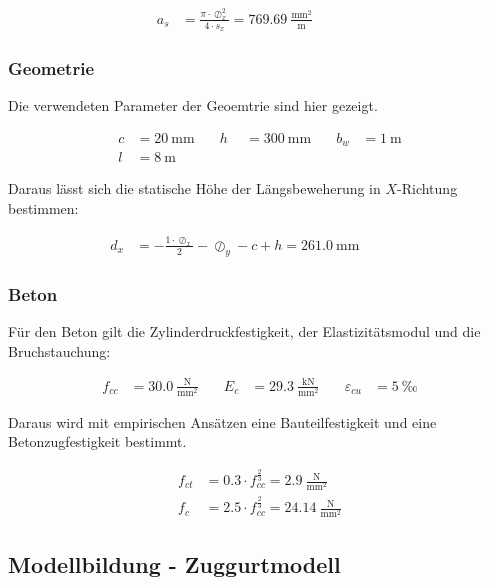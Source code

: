 \documentclass[
  11pt,
  letterpaper,
]{scrreprt}
\begin{document}
\[
\begin{aligned}
a_{s}& = \frac{\pi \cdot \oslash_{x}^{2}}{4 \cdot s_{x}} = 769.69 \ \frac{\mathrm{mm}^{2}}{\mathrm{m}} \quad &  \quad &  
 \end{aligned}
\]

\subsubsection{Geometrie}\label{geometrie}

Die verwendeten Parameter der Geoemtrie sind hier gezeigt.

\[
\begin{aligned}
c& = 20 \ \mathrm{mm} \quad & h& = 300 \ \mathrm{mm} \quad & b_{w}& = 1 \ \mathrm{m} \\ 
l& = 8 \ \mathrm{m} \quad &  \quad &  
 \end{aligned}
\]

Daraus lässt sich die statische Höhe der Längsbeweherung in
\(X\)-Richtung bestimmen:

\[
\begin{aligned}
d_{x}& = - \frac{1 \cdot \oslash_{x}}{2} - \oslash_{y} - c + h = 261.0 \ \mathrm{mm} \quad &  \quad &  
 \end{aligned}
\]

\subsubsection{Beton}\label{beton}

Für den Beton gilt die Zylinderdruckfestigkeit, der Elastizitätsmodul
und die Bruchstauchung:

\[
\begin{aligned}
f_{cc}& = 30.0 \ \frac{\mathrm{N}}{\mathrm{mm}^{2}} \quad & E_{c}& = 29.3 \ \frac{\mathrm{kN}}{\mathrm{mm}^{2}} \quad & \varepsilon_{cu}& = 5 \ \mathrm{‰} \end{aligned}
\]

Daraus wird mit empirischen Ansätzen eine Bauteilfestigkeit und eine
Betonzugfestigkeit bestimmt.

\[
\begin{aligned}
f_{ct}& = 0.3 \cdot f_{cc}^{\frac{2}{3}} = 2.9 \ \frac{\mathrm{N}}{\mathrm{mm}^{2}} \\ 
f_{c}& = 2.5 \cdot f_{cc}^{\frac{2}{3}} = 24.14 \ \frac{\mathrm{N}}{\mathrm{mm}^{2}} \end{aligned}
\]

\subsection{Modellbildung -
Zuggurtmodell}\label{modellbildung---zuggurtmodell}
\end{document}
